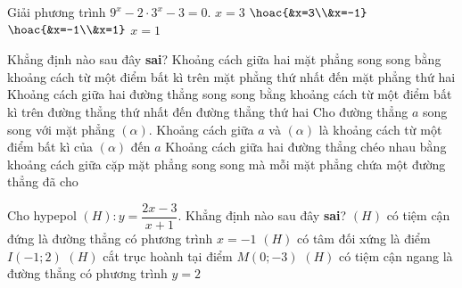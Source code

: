 \begin{ex}%
Giải phương trình $9^x-2\cdot 3^x-3=0$.
\choice
{$x=3$}
{$\hoac{&x=3\\&x=-1}$}
{$\hoac{&x=-1\\&x=1}$}
{\True $x=1$}
\end{ex}

\begin{ex}%
Khẳng định nào sau đây \textbf{sai}?
\choice
{Khoảng cách giữa hai mặt phẳng song song bằng khoảng cách từ một điểm bất kì trên mặt phẳng thứ nhất đến mặt phẳng thứ hai}
{Khoảng cách giữa hai đường thẳng song song bằng khoảng cách từ một điểm bất kì trên đường thẳng thứ nhất đến đường thẳng thứ hai}
{\True Cho đường thẳng $a$ song song với mặt phẳng $(\alpha)$. Khoảng cách giữa $a$ và $(\alpha)$ là khoảng cách từ một điểm bất kì của $(\alpha)$ đến $a$}
{Khoảng cách giữa hai đường thẳng chéo nhau bằng khoảng cách giữa cặp mặt phẳng song song mà mỗi mặt phẳng chứa một đường thẳng đã cho}
\end{ex}

\begin{ex}%
Cho hypepol $(H)\colon y=\dfrac{2x-3}{x+1}$. Khẳng định nào sau đây \textbf{sai}?
\choice
{$(H)$ có tiệm cận đứng là đường thẳng có phương trình $x=-1$}
{$(H)$ có tâm đối xứng là điểm $I(-1;2)$}
{\True $(H)$ cắt trục hoành tại điểm $M(0;-3)$}
{$(H)$ có tiệm cận ngang là đường thẳng có phương trình $y=2$}
\end{ex}

